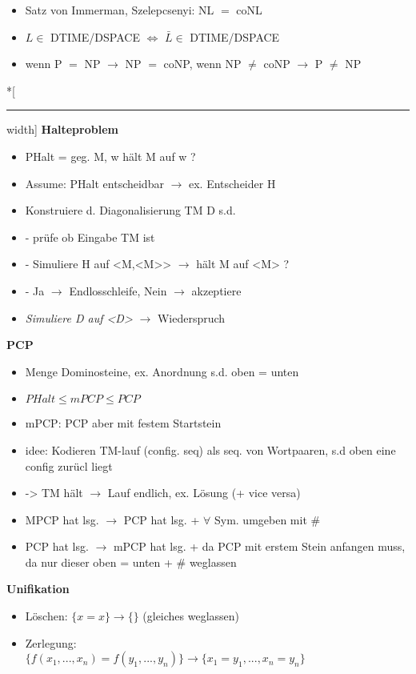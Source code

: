 \documentclass[12pt,a4paper]{article}
\begin{document}
\begin{paracol}{3}
\begin{itemize}
\item Satz von Immerman, Szelepcsenyi: NL $=$ coNL
\item $L \in$ DTIME/DSPACE $\Leftrightarrow$ $\bar{L}\in $ DTIME/DSPACE
\item wenn P $=$ NP $\rightarrow$  NP $=$ coNP, wenn NP $\neq$ coNP $\rightarrow$ P $\neq$ NP
\end{itemize}
\switchcolumn[0]*[\hrule width\textwidth]
\centering
\textbf{Halteproblem}
\flushleft
\begin{itemize}
\setlength\itemsep{-0.5em}
\item PHalt = geg. M, w hält M auf w ?
\item Assume: PHalt entscheidbar $\rightarrow$ ex. Entscheider H
\item Konstruiere d. Diagonalisierung TM D s.d.
\item -  prüfe ob Eingabe TM ist
\item -  Simuliere H auf <M,<M>> $\rightarrow$ hält M auf <M> ?
\item -  Ja $\rightarrow$ Endlosschleife, Nein $\rightarrow$ akzeptiere
\item \textit{Simuliere D auf <D>} $\rightarrow$ Wiederspruch
\end{itemize}
\switchcolumn[1]
\centering
\textbf{PCP}
\flushleft
\begin{itemize}
\setlength\itemsep{-0.5em}
\item Menge Dominosteine, ex. Anordnung s.d. oben = unten
\item $PHalt \leq mPCP \leq PCP$
\item mPCP: PCP aber mit festem Startstein
\item idee: Kodieren TM-lauf (config. seq) als seq. von Wortpaaren, s.d oben eine config zurücl liegt
\item ->  TM hält $\rightarrow$ Lauf endlich, ex. Lösung (+ vice versa)
\item MPCP hat lsg. $\rightarrow$ PCP hat lsg. + $\forall$ Sym. umgeben mit \#
\item PCP hat lsg. $\rightarrow$ mPCP hat lsg. + da PCP mit erstem Stein anfangen muss, da nur dieser oben = unten + \# weglassen
\end{itemize}
\switchcolumn[2]
\centering
\textbf{Unifikation}
\flushleft
\begin{itemize}
\setlength\itemsep{-0.5em}
\item Löschen: $\{x = x\} \rightarrow \{\}$ (gleiches weglassen)
\item Zerlegung: \\ $\{f(x_1, ..., x_n) = f(y_1, ..., y_n)\} \rightarrow \{x_1=y_1, ..., x_n=y_n\}$

\end{itemize}
\end{paracol}
\end{document}
